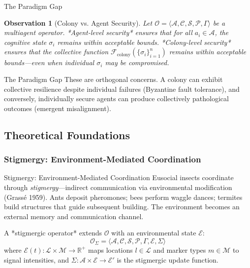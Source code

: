 \documentclass[
  ignorenonframetext,
]{beamer}
\newtheorem{observation}{Observation}
\begin{document}
\begin{frame}[allowframebreaks]{The Paradigm Gap}
\begin{observation}[Colony vs. Agent Security]
\label{obs:colony-agent}
Let $\mathcal{O} = \langle \mathcal{A}, \mathcal{C}, \mathcal{S}, \mathcal{P}, \Gamma \rangle$ be a multiagent operator. *Agent-level security* ensures that for all $a_i \in \mathcal{A}$, the cognitive state $\sigma_i$ remains within acceptable bounds. *Colony-level security* ensures that the collective function $\mathcal{F}_{\text{colony}}(\{\sigma_i\}_{i=1}^n)$ remains within acceptable bounds—even when individual $\sigma_i$ may be compromised.
\end{observation}

\end{frame}

\begin{frame}[allowframebreaks]{The Paradigm Gap}
These are orthogonal concerns. A colony can exhibit collective
resilience despite individual failures (Byzantine fault tolerance), and
conversely, individually secure agents can produce collectively
pathological outcomes (emergent misalignment).
\end{frame}

\begin{frame}
\end{frame}

\subsection{Theoretical Foundations}\label{sec:eusocial-theory}

\subsubsection{Stigmergy: Environment-Mediated
Coordination}\label{sec:stigmergy}

\begin{frame}[allowframebreaks]{Stigmergy: Environment-Mediated
Coordination}
Eusocial insects coordinate through \emph{stigmergy}---indirect
communication via environmental modification (Grassé 1959). Ants deposit
pheromones; bees perform waggle dances; termites build structures that
guide subsequent building. The environment becomes an external memory
and communication channel.

\begin{definition}
\label{def:stigmergic-operator}
A *stigmergic operator* extends $\mathcal{O}$ with an environmental state $\mathcal{E}$:
\begin{equation}
\label{eq:stigmergic-operator}
\mathcal{O}_\Sigma = \langle \mathcal{A}, \mathcal{C}, \mathcal{S}, \mathcal{P}, \Gamma, \mathcal{E}, \Sigma \rangle
\end{equation}
where $\mathcal{E}(t): \mathcal{L} \times \mathcal{M} \to \mathbb{R}^+$ maps locations $l \in \mathcal{L}$ and marker types $m \in \mathcal{M}$ to signal intensities, and $\Sigma: \mathcal{A} \times \mathcal{E} \to \mathcal{E}'$ is the stigmergic update function.
\end{definition}

\end{frame}
\end{document}
